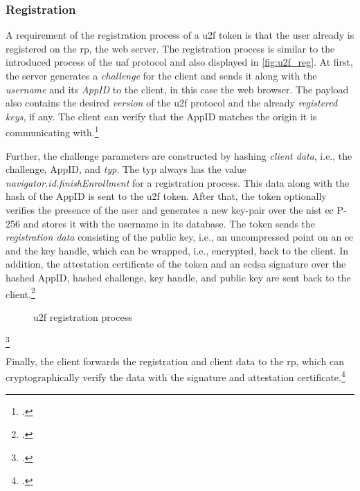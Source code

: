 \subsubsection{Registration}

A requirement of the registration process of a \gls{u2f} token is that the user already is registered on the \gls{rp}, the web server. The registration process is similar to the introduced process of the \gls{uaf} protocol and also displayed in \autoref{fig:u2f_reg}. At first, the server generates a \textit{challenge} for the client and sends it along with the \textit{username} and its \textit{AppID} to the client, in this case the web browser. The payload also contains the desired \textit{version} of the \gls{u2f} protocol and the already \textit{registered keys}, if any. The client can verify that the AppID matches the origin it is communicating with.\footcites[See][4--5]{u2f-js-api}[See][431]{10.1007/978-3-662-54970-4_25}

Further, the challenge parameters are constructed by hashing \textit{client data}, i.e., the challenge, AppID, and \textit{typ}. The typ always has the value \textit{navigator.id.finishEnrollment} for a registration process. This data along with the hash of the AppID is sent to the \gls{u2f} token. After that, the token optionally verifies the presence of the user and generates a new key-pair over the \gls{nist} \gls{ec} P-256 and stores it with the username in its database. The token sends the \textit{registration data} consisting of the public key, i.e., an uncompressed point on an \gls{ec} and the key handle, which can be wrapped, i.e., encrypted, back to the client. In addition, the attestation certificate of the token and an \gls{ecdsa} signature over the hashed AppID, hashed challenge, key handle, and public key are sent back to the client.\footcites[See][4--5]{u2f-raw-message}[See][70]{10.1007/978-3-319-75650-9_5}

\begin{figure}[hbt]
	\centering
	
	\caption[\gls{u2f} registration process]{\gls{u2f} registration process\footnotemark}
	\label{fig:u2f_reg}
\end{figure}
\footcitetexts[Source: diagram by author, based on][69]{10.1007/978-3-319-75650-9_5}[][428]{10.1007/978-3-662-54970-4_25}

Finally, the client forwards the registration and client data to the \gls{rp}, which can cryptographically verify the data with the signature and attestation certificate.\footcites[See][3]{7860546}

